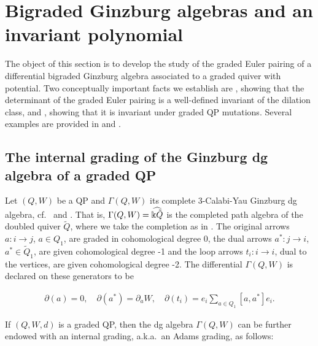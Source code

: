 \section{Bigraded Ginzburg algebras and an invariant polynomial}
\label{sec:euler}

The object of this section is to develop the study of the graded Euler pairing of a differential bigraded Ginzburg algebra associated to a graded quiver with potential. Two conceptually important facts we establish are , showing that the determinant of the graded Euler pairing is a well-defined invariant of the dilation class, and , showing that it is invariant under graded QP mutations. Several examples are provided in  and .

\subsection{The internal grading of the Ginzburg dg algebra of a graded QP}

Let \((Q,W)\) be a QP and $\Gamma(Q,W)$ its complete 3-Calabi-Yau Ginzburg dg algebra, cf.~\cite[Section 4.2]{Ginzburg} and \cite[Section~2.6]{KellerYang}. That is, $\Gamma(Q,W)=\widehat{\Bbbk{\tilde{Q}}}$ is the completed path algebra of the doubled quiver $\tilde{Q}$, where we take the completion as in \cite{KellerYang}. The original arrows $a:i\to j$, $a\in Q_1$, are graded in cohomological degree 0, the dual arrows $a^*:j\to i$, $a^*\in \tilde{Q}_1$, are given cohomological degree -1 and the loop arrows $t_i:i\to i$, dual to the vertices, are given cohomological degree -2. The differential $\Gamma(Q,W)$ is declared on these generators to be

\begin{align*}
 \partial(a)=0,\quad \partial(a^*)=\partial_aW,\quad \partial(t_i)=e_i\sum_{a\in Q_1}[a,a^*]e_i.
\end{align*}

If $(Q,W,d)$ is a graded QP, then the dg algebra $\Gamma(Q,W)$ can be further endowed with an internal grading, a.k.a.~an Adams grading, as follows:

